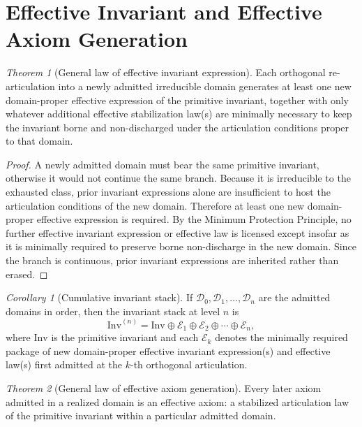 \documentclass[11pt]{article}
\theoremstyle{definition}
\theoremstyle{plain}
\theoremstyle{remark}
\newtheorem{theorem}{Theorem}
\newtheorem{corollary}{Corollary}
\newcommand{\Inv}{\mathrm{Inv}}
\newcommand{\Dom}{\mathcal{D}}
\newcommand{\EffPkg}{\mathcal{E}}
\begin{document}
\section{Effective Invariant and Effective Axiom Generation}

\begin{theorem}[General law of effective invariant expression]
\label{thm:effective-invariants}
Each orthogonal re-articulation into a newly admitted irreducible domain generates at least one new domain-proper effective expression of the primitive invariant, together with only whatever additional effective stabilization law(s) are minimally necessary to keep the invariant borne and non-discharged under the articulation conditions proper to that domain.
\end{theorem}

\begin{proof}
A newly admitted domain must bear the same primitive invariant, otherwise it would not continue the same branch. Because it is irreducible to the exhausted class, prior invariant expressions alone are insufficient to host the articulation conditions of the new domain. Therefore at least one new domain-proper effective expression is required. By the Minimum Protection Principle, no further effective invariant expression or effective law is licensed except insofar as it is minimally required to preserve borne non-discharge in the new domain. Since the branch is continuous, prior invariant expressions are inherited rather than erased. 
\end{proof}

\begin{corollary}[Cumulative invariant stack]
If $\Dom_0,\Dom_1,\dots,\Dom_n$ are the admitted domains in order, then the invariant stack at level $n$ is
\[
\Inv^{(n)} = \Inv \oplus \EffPkg_1 \oplus \EffPkg_2 \oplus \cdots \oplus \EffPkg_n,
\]
where $\Inv$ is the primitive invariant and each $\EffPkg_k$ denotes the minimally required package of new domain-proper effective invariant expression(s) and effective law(s) first admitted at the $k$-th orthogonal articulation.
\end{corollary}

\begin{theorem}[General law of effective axiom generation]
\label{thm:effective-axioms}
Every later axiom admitted in a realized domain is an effective axiom: a stabilized articulation law of the primitive invariant within a particular admitted domain.
\end{theorem}
\end{document}

